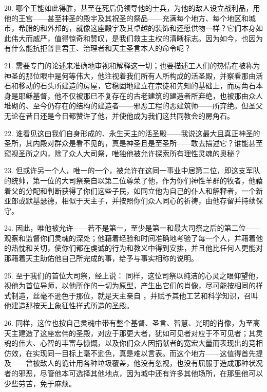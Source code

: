 20. 哪个王能如此得胜，甚至在死后仍领导他的士兵，为他的敌人设立战利品，用他的王宫——甚至神圣的殿宇及其祝圣的祭品——充满每个地方、每个地区和城市，希腊的和外邦的，就像这座殿宇及其卓越的装饰和还愿供物一样？它们本身如此伟大而威严，值得惊奇和赞叹，是我们救主主权的清晰标志。因为如今，也因为有什么能抗拒普世君王、治理者和天主圣言本人的命令呢？\par

21. 需要专门的论述来准确地审视和解释这一切；也要描述工人们的热情在被称为神圣的那位眼中是何等伟大，他注视着我们所有人所构成的活圣殿，并察看那由活石和移动的石头所建造的房屋，它稳固地建立在宗徒和先知的基础上，而房角石本身是耶稣基督，他不仅被那已不复存在的古老建筑的建造者所弃绝，也被那由众人堆砌的、至今仍存在的结构的建造者——邪恶工程的恶建筑师——所弃绝。但圣父无论在昔日还是今日都赞许了他，并使他成为我们这共同教会的房角石。\par

22. 谁看见这由我们自身形成的、永生天主的活圣殿——我说这最大且真正神圣的圣所，其内殿对群众是看不见的，真是神圣且是至圣所——敢去描述它？谁能甚至窥视圣所之内，除了众人大司祭，唯独他被允许探索所有理性灵魂的奥秘？\par

23. 但或许另一个人，唯一的一个，被允许在这同一事业中居第二位，即这支军队的统帅，第一位的大司祭亲自以第二位尊荣了他，作为你们神性羊群的牧者，他藉着父的分配和判断获得了你们这些子民，如同立他为自己的仆人和解释者，一个新亚郎或默基瑟德，相似于天主子，并按照你们众人同心的祈祷，由他存留并持续保守。\par

24. 因此，唯他被允许——若不是第一，至少是第一和最大司祭之后的第二位——观察和监督你们灵魂的深处；他藉着经验和时间准确地考验了每一个人，并藉着他的热忱和关切，使你们都在虔诚的行为和教义中得到安排，并且他比任何人更能对那藉着天主助佑他自己所完成的事，给予与事实相称的说明。\par

25. 至于我们的首位大司祭，经上说：  同样，这位司祭以纯洁的心灵之眼仰望他，视他为首位导师，以他所作的一切为原型，产生出它们的肖像，尽可能按相同的样式制造，丝毫不逊色于那位，就是天主亲自 ，并赋予其他工艺和科学知识，召叫他建造那按天上象征性样式所造的圣殿。\par

26. 同样，这位也按自己灵魂中带有整个基督、圣言、智慧、光明的肖像，为至高天主建造了这座宏伟的圣殿，对应于那更大者，犹如可见者对应于不可见者；其灵魂的伟大、心智的丰富与慷慨，以及你们众人因捐献者的宽宏大量而表现出的竞相仿效，在实现同一目标上毫不逊色，真是难以言表。而这个地方——这值得首先提及——曾被敌人的诡计用各种垃圾覆盖，他没有忽视，也没有屈服于造成那种状况者的邪恶，尽管他本可选择其他地点，因为城中还有许多其他场所，在那里他可以少些劳苦，免于麻烦。\par

